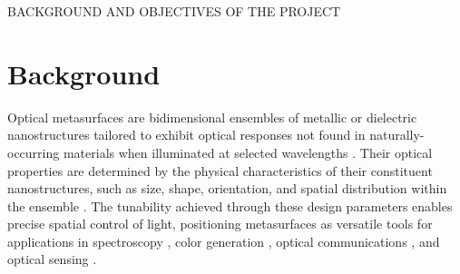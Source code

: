 
		 {\MakeUppercase{Background and Objectives of the  Project}}

\section*{Background}

Optical metasurfaces are bidimensional ensembles of metallic or dielectric nanostructures tailored to  exhibit optical responses not found in naturally-occurring materials when illuminated at selected wavelengths \cite{khan_optical_2022,gonzalez-alcalde_large_2020}. Their optical properties are determined by the physical characteristics of their constituent nanostructures, such as size, shape, orientation, and spatial distribution within the ensemble \cite{kim_plasmonic_2019,khan_optical_2022}. The tunability achieved through these design parameters enables precise spatial control of light, positioning metasurfaces as versatile tools for applications in spectroscopy \cite{khan_optical_2022}, color generation \cite{gonzalez-alcalde_large_2020}, optical communications \cite{chen_review_2016}, and optical sensing \cite{estevez_trends_2014,jain_noble_2008,kim_plasmonic_2019}.

